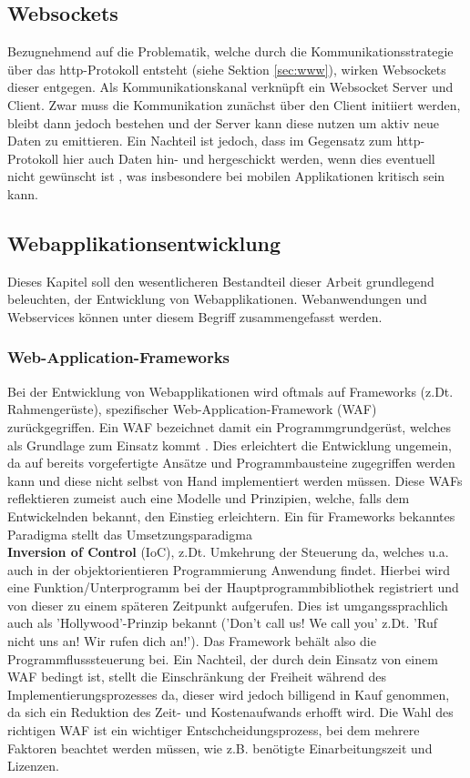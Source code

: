 \subsection{Websockets}\label{sec:websockets}
Bezugnehmend auf die Problematik, welche durch die Kommunikationsstrategie über das http-Protokoll entsteht (siehe Sektion \ref{sec:www}), wirken Websockets dieser entgegen. Als Kommunikationskanal verknüpft ein Websocket Server und Client. Zwar muss die Kommunikation zunächst über den Client initiiert werden, bleibt dann jedoch bestehen und der Server kann diese nutzen um aktiv neue Daten zu emittieren. Ein Nachteil ist jedoch, dass im Gegensatz zum http-Protokoll hier auch Daten hin- und hergeschickt werden, wenn dies eventuell nicht gewünscht ist \cite{neumann2015entwicklung}, was insbesondere bei mobilen Applikationen kritisch sein kann. 

\subsection{Webapplikationsentwicklung}\label{sec:softwareentwicklung}
Dieses Kapitel soll den wesentlicheren Bestandteil dieser Arbeit grundlegend beleuchten, der Entwicklung von Webapplikationen.
Webanwendungen und Webservices können unter diesem Begriff zusammengefasst werden.
 \\ 
\subsubsection{Web-Application-Frameworks} \label{sec:wafs}
Bei der Entwicklung von Webapplikationen wird oftmals auf Frameworks (z.Dt. Rahmengerüste), spezifischer Web-Application-Framework (WAF) zurückgegriffen. 
Ein WAF bezeichnet damit ein Programmgrundgerüst, welches als Grundlage zum Einsatz kommt \cite{Ionis2019:online}. Dies erleichtert die Entwicklung ungemein, da auf bereits vorgefertigte Ansätze und Programmbausteine zugegriffen werden kann und diese nicht selbst von Hand implementiert werden müssen. Diese WAFs reflektieren zumeist auch eine Modelle und Prinzipien, welche, falls dem Entwickelnden bekannt, den Einstieg erleichtern. 
Ein für Frameworks bekanntes Paradigma stellt das Umsetzungsparadigma \\
\textbf{Inversion of Control} (IoC), z.Dt. Umkehrung der Steuerung da, welches u.a. auch in der objektorientieren Programmierung Anwendung findet.
Hierbei wird eine Funktion/Unterprogramm bei der Hauptprogrammbibliothek registriert und von dieser zu einem späteren Zeitpunkt aufgerufen. Dies ist umgangssprachlich auch als 'Hollywood'-Prinzip bekannt ('Don't call us! We call you' z.Dt. 'Ruf nicht uns an! Wir rufen dich an!'). Das Framework behält also die Programmflusssteuerung bei. 
  Ein Nachteil, der durch dein Einsatz von einem WAF bedingt ist, stellt die Einschränkung der Freiheit während des Implementierungsprozesses da, dieser wird jedoch billigend in Kauf genommen, da sich ein Reduktion des Zeit- und Kostenaufwands erhofft wird. Die Wahl des richtigen WAF ist ein wichtiger Entschcheidungsprozess, bei dem mehrere Faktoren beachtet werden müssen, wie z.B. benötigte Einarbeitungszeit und Lizenzen.

